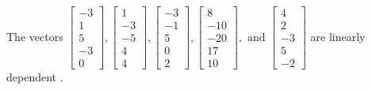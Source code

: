 \begin{exercise}
\begin{exerciseStatement}
  \end{exerciseStatement}
  \begin{exerciseAnswer}
   The vectors \(\left[\begin{array}{r}
-3 \\
1 \\
5 \\
-3 \\
0
\end{array}\right] , \left[\begin{array}{r}
1 \\
-3 \\
-5 \\
4 \\
4
\end{array}\right] , \left[\begin{array}{r}
-3 \\
-1 \\
5 \\
0 \\
2
\end{array}\right] , \left[\begin{array}{r}
8 \\
-10 \\
-20 \\
17 \\
10
\end{array}\right] , \text{ and } \left[\begin{array}{r}
4 \\
2 \\
-3 \\
5 \\
-2
\end{array}\right]\) are 
  	 linearly dependent  .
  


  \end{exerciseAnswer}
\end{exercise}